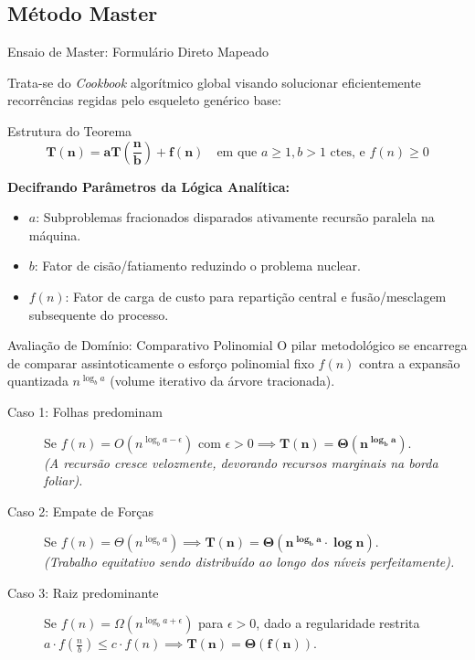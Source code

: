 \documentclass{beamer}
\begin{document}
\subsection{Método Master}
 \begin{frame}{Ensaio de Master: Formulário Direto Mapeado}   

Trata-se do \textit{Cookbook} algorítmico global \cite{A03} visando solucionar eficientemente recorrências regidas pelo esqueleto genérico base:
\begin{alertblock}{Estrutura do Teorema}
 $$\mathbf{T(n) = aT\left(\frac{n}{b}\right) + f(n)} \quad \text{em que } a\geq 1, b > 1 \text{ ctes, e } f(n) \geq 0$$
\end{alertblock}
\pause
\textbf{Decifrando Parâmetros da Lógica Analítica:}
\begin{itemize}
 \item $a$: Subproblemas fracionados disparados ativamente recursão paralela na máquina.
 \item $b$: Fator de cisão/fatiamento reduzindo o problema nuclear.
 \item $f(n)$: Fator de carga de custo para repartição central e fusão/mesclagem subsequente do processo.
\end{itemize}
\end{frame}


\begin{frame}{Avaliação de Domínio: Comparativo Polinomial}   
O pilar metodológico se encarrega de comparar assintoticamente o esforço polinomial fixo $f(n)$ contra a expansão quantizada $n^{\log_b a}$ (volume iterativo da árvore tracionada).

\pause
\begin{description}
 \item[Caso 1: Folhas predominam] Se $f(n) = O(n^{\log_b a - \epsilon})$ com $\epsilon > 0 \implies \mathbf{T(n) = \Theta(n^{\log_b a})}$. \\ \textit{(A recursão cresce velozmente, devorando recursos marginais na borda foliar).}
 \pause
 \item[Caso 2: Empate de Forças] Se $f(n) = \Theta(n^{\log_b a}) \implies \mathbf{T(n) = \Theta(n^{\log_b a} \cdot \log n)}$. \\ \textit{(Trabalho equitativo sendo distribuído ao longo dos níveis perfeitamente).}
 \pause
 \item[Caso 3: Raiz predominante] Se $f(n) = \Omega(n^{\log_b a + \epsilon})$ para $\epsilon > 0$, dado a regularidade restrita $a \cdot f(\frac{n}{b}) \leq c \cdot f(n) \implies \mathbf{T(n) = \Theta(f(n))}$.
\end{description}
\end{frame}
\end{document}
